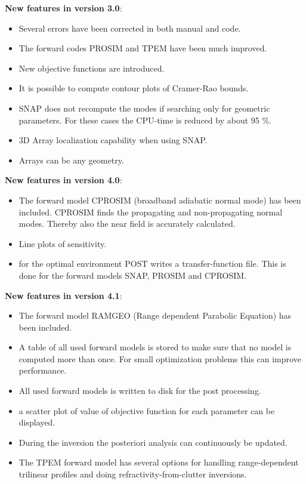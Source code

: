 \documentclass{saclantc}
\begin{document}
\begin{prelims}
{\bf New features in version 3.0}:
\begin{itemize}
\item Several errors have been corrected in both manual and code.
\item The forward codes {\sf PROSIM} and {\sf TPEM} have been much improved.
\item New objective functions are introduced.
\item It is possible to compute contour plots of Cramer-Rao bounds.
\item {\sf SNAP} does not recompute the modes if searching only for
geometric parameters. For these cases the CPU-time is reduced by about
95 \%.
\item 3D Array localization capability when using {\sf SNAP}.
\item Arrays can be any geometry.
\end{itemize}

{\bf New features in version 4.0}:
\begin{itemize}
\item The forward model {\sf CPROSIM} (broadband adiabatic normal mode) has been included.
 {\sf CPROSIM}  finds the propagating and non-propagating normal modes. Thereby also the near field is accurately calculated.
\item Line plots of sensitivity.
\item for the optimal environment {\sf POST} writes a transfer-function file.
This is done for the forward models {\sf SNAP}, {\sf PROSIM} and {\sf CPROSIM}.
\end{itemize}

{\bf New features in version 4.1}:
\begin{itemize}
\vspace{-0.2cm}
\item The forward model {\sf RAMGEO}  (Range dependent Parabolic
Equation) has been included.
\item A table of all used forward models is stored  to make sure that no model
is computed more than once. For small optimization problems this can
improve performance.
\item All used forward models is written to disk for the post processing.
\item a scatter plot of value of objective function for each parameter
  can be displayed.
\item During the inversion the posteriori analysis  can continuously be
updated. 
\item The {\sf TPEM} forward model has several options for handling
range-dependent trilinear profiles and doing refractivity-from-clutter
inversions.
\end{itemize}


\end{prelims}
\end{document}
